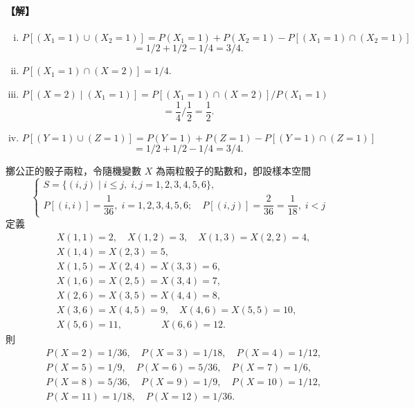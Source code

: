 \paragraph{【解】}
\begin{enumerate}[(i)]
  \item $P[(X_1 = 1) \cup (X_2 = 1)] = P(X_1 = 1) + P(X_2 = 1) - P[(X_1 = 1) \cap (X_2 = 1)]$
  \[
  = 1/2 + 1/2 - 1/4 = 3/4.
  \]
  \item $P[(X_1 = 1) \cap (X = 2)] = 1/4.$
  \item $P[(X = 2) \mid (X_1 = 1)] = P[(X_1 = 1) \cap (X = 2)] / P(X_1 = 1)$
  \[
  = \frac{1}{4} \Big/ \frac{1}{2} = \frac{1}{2}.
  \]
  \item $P[(Y = 1) \cup (Z = 1)] = P(Y = 1) + P(Z = 1) - P[(Y = 1) \cap (Z = 1)]$
  \[
  = 1/2 + 1/2 - 1/4 = 3/4. \tag*{\#}
  \]
\end{enumerate}

\medskip
\begin{example}\label{ex:b5-5-3}
擲公正的骰子兩粒，令隨機變數 $X$ 為兩粒骰子的點數和，卽設樣本空間
\[
\begin{cases}
S = \{(i, j) \mid i \le j, \; i, j = 1, 2, 3, 4, 5, 6\}, \\
P[(i, i)] = \dfrac{1}{36}, \; i = 1, 2, 3, 4, 5, 6; \quad P[(i, j)] = \dfrac{2}{36} = \dfrac{1}{18}, \; i < j
\end{cases}
\]
定義
\begin{align*}
&X(1, 1) = 2, \quad X(1, 2) = 3, \quad X(1, 3) = X(2, 2) = 4, \\
&X(1, 4) = X(2, 3) = 5, \\
&X(1, 5) = X(2, 4) = X(3, 3) = 6, \\
&X(1, 6) = X(2, 5) = X(3, 4) = 7, \\
&X(2, 6) = X(3, 5) = X(4, 4) = 8, \\
&X(3, 6) = X(4, 5) = 9, \quad X(4, 6) = X(5, 5) = 10, \\
&X(5, 6) = 11, \qquad\qquad X(6, 6) = 12.
\end{align*}
則
\begin{align*}
&P(X = 2) = 1/36, \quad P(X = 3) = 1/18, \quad P(X = 4) = 1/12, \\
&P(X = 5) = 1/9, \quad P(X = 6) = 5/36, \quad P(X = 7) = 1/6, \\
&P(X = 8) = 5/36, \quad P(X = 9) = 1/9, \quad P(X = 10) = 1/12, \\
&P(X = 11) = 1/18, \quad P(X = 12) = 1/36. \tag*{\#}
\end{align*}
\end{example}

